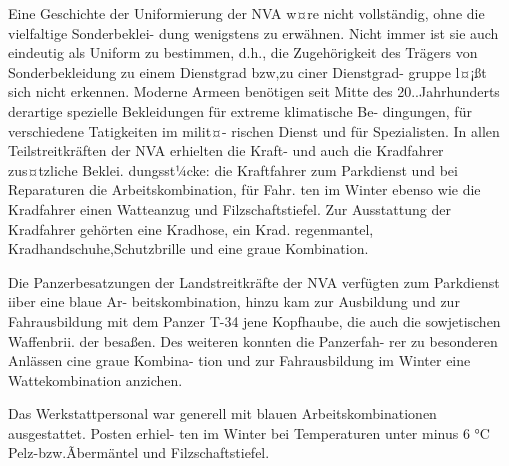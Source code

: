 

Eine Geschichte der Uniformierung der NVA w¤re
nicht vollständig, ohne die vielfaltige Sonderbeklei-
dung wenigstens zu erwähnen. Nicht immer ist sie
auch eindeutig als Uniform zu bestimmen, d.h., die
Zugehörigkeit des Trägers von Sonderbekleidung
zu einem Dienstgrad bzw,zu ciner Dienstgrad-
gruppe l¤¡ßt sich nicht erkennen. Moderne Armeen
benötigen seit Mitte des 20..Jahrhunderts derartige
spezielle Bekleidungen für extreme klimatische Be-
dingungen, für verschiedene Tatigkeiten im milit¤-
rischen Dienst und für Spezialisten.
In allen Teilstreitkräften der NVA erhielten die
Kraft- und auch die Kradfahrer zus¤tzliche Beklei.
dungsst¼cke: die Kraftfahrer zum Parkdienst und
bei Reparaturen die Arbeitskombination, für Fahr.
ten im Winter ebenso wie die Kradfahrer einen
Watteanzug und Filzschaftstiefel. Zur Ausstattung
der Kradfahrer gehörten eine Kradhose, ein Krad.
regenmantel, Kradhandschuhe,Schutzbrille und
eine graue Kombination.

Die Panzerbesatzungen der Landstreitkräfte der
NVA verfügten zum Parkdienst iiber eine blaue Ar-
beitskombination, hinzu kam zur Ausbildung und
zur Fahrausbildung mit dem Panzer T-34 jene
Kopfhaube, die auch die sowjetischen Waffenbrii.
der besaßen. Des weiteren konnten die Panzerfah-
rer zu besonderen Anlässen cine graue Kombina-
tion und zur Fahrausbildung im Winter eine
Wattekombination anzichen.

Das Werkstattpersonal war generell mit blauen
Arbeitskombinationen ausgestattet. Posten erhiel-
ten im Winter bei Temperaturen unter minus 6 °C
Pelz-bzw.Ãbermäntel und Filzschaftstiefel.

